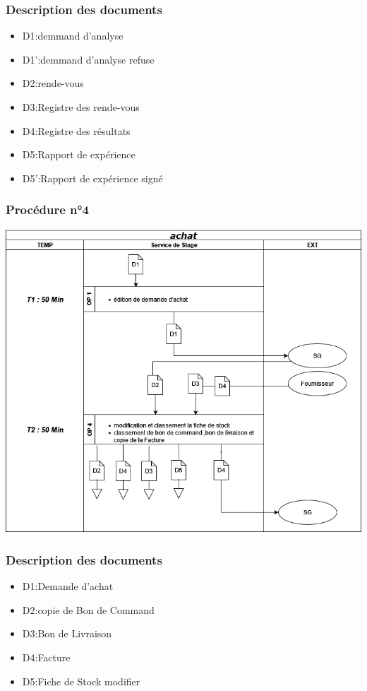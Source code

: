 \subsubsection*{Description des documents}
\begin{itemize}
    \item D1:demmand d'analyse
    \item D1':demmand d'analyse refuse
    \item D2:rende-vous
    \item D3:Registre des rende-vous
    \item D4:Registre des résultats
    \item D5:Rapport de expérience
    \item D5':Rapport de expérience signé
\end{itemize}


\subsubsection*{Procédure n°4}
\includegraphics[width=1\textwidth]{chapter/Study of the Existing/EP/achat.png}
\subsubsection*{Description des documents}
\begin{itemize}
    \item D1:Demande d'achat
    \item D2:copie de Bon de Command
    \item D3:Bon de Livraison
    \item D4:Facture
    \item D5:Fiche de Stock modifier
\end{itemize}


